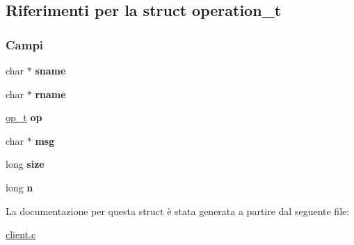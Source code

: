 \hypertarget{structoperation__t}{}\subsection{Riferimenti per la struct operation\+\_\+t}
\label{structoperation__t}
\subsubsection*{Campi}
\begin{DoxyCompactItemize}
\item 
\mbox{\label{structoperation__t_a7822f225cfc9123dab423ba683c1aace}} 
char $\ast$ {\bfseries sname}
\item 
\mbox{\label{structoperation__t_a6889a2b00ba2ad2d34666eea3d59e736}} 
char $\ast$ {\bfseries rname}
\item 
\mbox{\label{structoperation__t_afa66e43cb50d2792e12f7a2b054bc396}} 
\mbox{\hyperlink{ops_8h_ac6fa1b34da8872e34c2936391332f44c}{op\+\_\+t}} {\bfseries op}
\item 
\mbox{\label{structoperation__t_a3034fb2b256feb05ef6d4d034cb17265}} 
char $\ast$ {\bfseries msg}
\item 
\mbox{\label{structoperation__t_a453c2473442f61fbc268d30c8ebb4338}} 
long {\bfseries size}
\item 
\mbox{\label{structoperation__t_aa18a74143d24d04171d8b8206ae9d15b}} 
long {\bfseries n}
\end{DoxyCompactItemize}


La documentazione per questa struct è stata generata a partire dal seguente file\+:\begin{DoxyCompactItemize}
\item 
\mbox{\hyperlink{client_8c}{client.\+c}}\end{DoxyCompactItemize}
